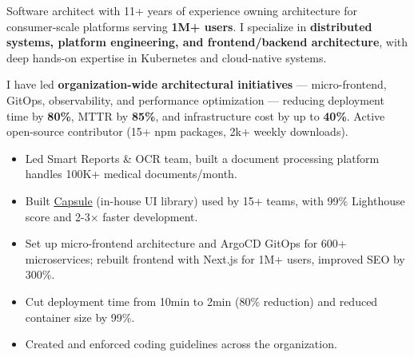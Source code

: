 \documentclass[10pt,a4paper,ragged2e,withhyper]{altacv}
\begin{document}


\makecvheader

Software architect with 11+ years of experience owning architecture for consumer-scale
platforms serving \textbf{1M+ users}. I specialize in \textbf{distributed systems, platform
engineering, and frontend/backend architecture}, with deep hands-on expertise in Kubernetes
and cloud-native systems.

\smallskip

I have led \textbf{organization-wide architectural initiatives} — micro-frontend, GitOps,
observability, and performance optimization — reducing deployment time by \textbf{80\%},
MTTR by \textbf{85\%}, and infrastructure cost by up to \textbf{40\%}. Active open-source
contributor (15+ npm packages, 2k+ weekly downloads).

\medskip



\begin{itemize}
\item Led Smart Reports \& OCR team, built a document processing platform handles 100K+ medical documents/month.
\item Built \href{https://design.bajajfinservhealth.in}{Capsule} (in-house UI library) used by 15+ teams, with 99\% Lighthouse score and 2-3× faster development.
\item Set up micro-frontend architecture and ArgoCD GitOps for 600+ microservices; rebuilt frontend with Next.js for 1M+ users, improved SEO by 300\%.
\item Cut deployment time from 10min to 2min (80\% reduction) and reduced container size by 99\%.
\item Created and enforced coding guidelines across the organization.
\end{itemize}

{\small{}      }

\bigskip

\end{document}
